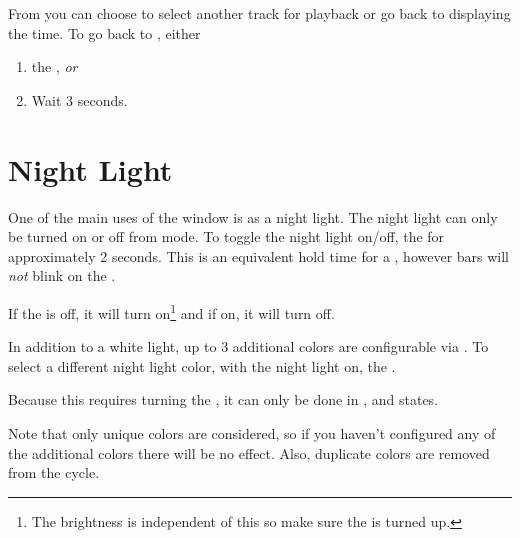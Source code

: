 From  you can choose to select another track for playback or go back
to displaying the time.  To go back to , either

\begin{enumerate}
  \item {} the , \textit{or}
  \item Wait \num{3} seconds.
\end{enumerate}

\section{Night Light} \label{Night Light}

One of the main uses of the  window is as a night light. The night
light can only be turned on or off from  mode.  To toggle the night
light on\slash off,  the  for approximately \num{2} seconds.
This is an equivalent hold time for a , however bars will \textit{not}
blink on the .


If the  is off, it will turn on\footnote{ The brightness is independent
of this so make sure the  is turned up.} and if on, it will turn off.

In addition to a white light, up to \num{3} additional colors are configurable
via \hyperref[Set Night Light]{}.  To select a different night light
color, with the night light on,  the .


Because this requires turning the , it can only be done in ,
 and  states.

\par\medskip

Note that only unique colors are considered, so if you haven't
configured any of the additional colors there will be no effect.  Also,
duplicate colors are removed from the cycle.

